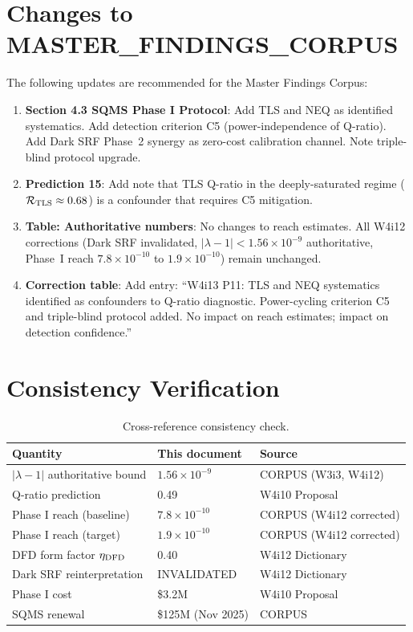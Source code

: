 \documentclass[11pt]{article}
\newcommand{\lbone}{|\lambda - 1|}
\newcommand{\ee}[1]{\times 10^{#1}}
\theoremstyle{definition}
\theoremstyle{remark}
\begin{document}
\section{Changes to MASTER\_FINDINGS\_CORPUS}

The following updates are recommended for the Master Findings Corpus:

\begin{enumerate}
\item \textbf{Section 4.3 SQMS Phase I Protocol}: Add TLS and NEQ as
  identified systematics. Add detection criterion C5 (power-independence
  of Q-ratio). Add Dark SRF Phase~2 synergy as zero-cost calibration
  channel. Note triple-blind protocol upgrade.

\item \textbf{Prediction 15}: Add note that TLS Q-ratio in the
  deeply-saturated regime ($\mathcal{R}_{\rm TLS} \approx 0.68$)
  is a confounder that requires C5 mitigation.

\item \textbf{Table: Authoritative numbers}: No changes to reach
  estimates. All W4i12 corrections (Dark SRF invalidated,
  $\lbone < 1.56\ee{-9}$ authoritative, Phase~I reach
  $7.8\ee{-10}$ to $1.9\ee{-10}$) remain unchanged.

\item \textbf{Correction table}: Add entry: ``W4i13 P11: TLS and NEQ
  systematics identified as confounders to Q-ratio diagnostic.
  Power-cycling criterion C5 and triple-blind protocol added.
  No impact on reach estimates; impact on detection confidence.''
\end{enumerate}


\section{Consistency Verification}

\begin{table}[H]
\centering
\caption{Cross-reference consistency check.}
\label{tab:consistency}
\renewcommand{\arraystretch}{1.25}
\begin{tabular}{@{}lll@{}}
\toprule
\textbf{Quantity} & \textbf{This document} & \textbf{Source} \\
\midrule
$\lbone$ authoritative bound & $1.56\ee{-9}$ & CORPUS (W3i3, W4i12) \\
Q-ratio prediction & 0.49 & W4i10 Proposal \\
Phase I reach (baseline) & $7.8\ee{-10}$ & CORPUS (W4i12 corrected) \\
Phase I reach (target) & $1.9\ee{-10}$ & CORPUS (W4i12 corrected) \\
DFD form factor $\eta_{\rm DFD}$ & 0.40 & W4i12 Dictionary \\
Dark SRF reinterpretation & INVALIDATED & W4i12 Dictionary \\
Phase I cost & \$3.2M & W4i10 Proposal \\
SQMS renewal & \$125M (Nov 2025) & CORPUS \\
\bottomrule
\end{tabular}
\end{table}
\end{document}

